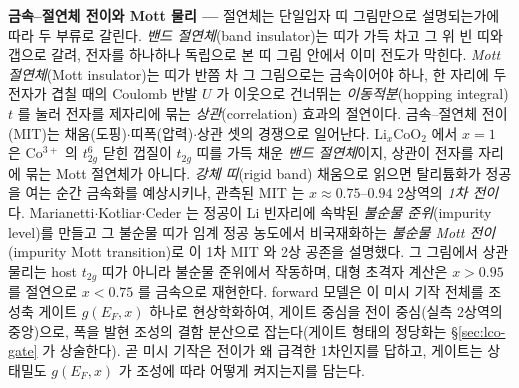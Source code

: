 \begin{bgbox}
\textbf{금속--절연체 전이와 Mott 물리 ---} 절연체는 단일입자 띠 그림만으로 설명되는가에 따라 두 부류로
갈린다. \emph{밴드 절연체}(band insulator)는 띠가 가득 차고 그 위 빈 띠와 갭으로 갈려, 전자를 하나하나
독립으로 본 띠 그림 안에서 이미 전도가 막힌다. \emph{Mott 절연체}(Mott insulator)는 띠가 반쯤 차 그
그림으로는 금속이어야 하나, 한 자리에 두 전자가 겹칠 때의 Coulomb 반발 $U$ 가 이웃으로 건너뛰는
\emph{이동적분}(hopping integral) $t$ 를 눌러 전자를 제자리에 묶는 \emph{상관}(correlation) 효과의
절연이다\cite{mott1968,imada1998}. 금속--절연체 전이(MIT)는 채움(도핑)$\cdot$띠폭(압력)$\cdot$상관 셋의
경쟁으로 일어난다\cite{imada1998}. $\mathrm{Li}_x\mathrm{CoO_2}$ 에서 $x{=}1$ 은 Co$^{3+}$ 의 $t_{2g}^6$
닫힌 껍질이 $t_{2g}$ 띠를 가득 채운 \emph{밴드 절연체}이지, 상관이 전자를 자리에 묶는 Mott 절연체가
아니다\cite{menetrier1999}. \emph{강체 띠}(rigid band) 채움으로 읽으면 탈리튬화가 정공을 여는 순간
금속화를 예상시키나, 관측된 MIT 는 $x\approx0.75$--$0.94$ 2상역의 \emph{1차 전이}
다\cite{menetrier1999,reimers1992,motohashi2009}. Marianetti$\cdot$Kotliar$\cdot$Ceder 는 정공이 Li 빈자리에
속박된 \emph{불순물 준위}(impurity level)를 만들고 그 불순물 띠가 임계 정공 농도에서 비국재화하는
\emph{불순물 Mott 전이}(impurity Mott transition)로 이 1차 MIT 와 2상 공존을 설명했다\cite{marianetti2004}.
그 그림에서 상관 물리는 host $t_{2g}$ 띠가 아니라 불순물 준위에서 작동하며, 대형 초격자 계산은 $x{>}0.95$ 를
절연으로 $x{<}0.75$ 를 금속으로 재현한다. forward 모델은 이 미시 기작 전체를 조성축 게이트 $g(E_F,x)$ 하나로
현상학화하여, 게이트 중심을 전이 중심(실측 2상역의 중앙)으로, 폭을 발현 조성의 결함 분산으로 잡는다(게이트
형태의 정당화는 \S\ref{sec:lco-gate} 가 상술한다). 곧 미시 기작은 전이가 왜 급격한 1차인지를 답하고,
게이트는 상태밀도 $g(E_F,x)$ 가 조성에 따라 어떻게 켜지는지를 담는다.
\end{bgbox}

